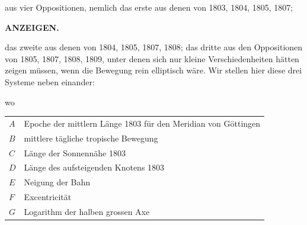 aus vier Oppositionen, nemlich das erste aus denen von 1803, 1804, 1805, 1807;
\par\clearpage
\thispagestyle{empty}
\noindent{}%
%
\parbox[t]{\dimexpr\linewidth-24mm\relax}{\centering\footnotesize\bfseries ANZEIGEN.\par}%
\makebox[12mm][r]{}\par\nobreak\medskip
\noindent das zweite aus denen von 1804, 1805, 1807, 1808; das dritte aus den Oppositionen
von 1805, 1807, 1808, 1809, unter denen sich nur kleine Verschiedenheiten
hätten zeigen müssen, wenn die Bewegung rein elliptisch wäre. Wir stellen
hier diese drei Systeme neben einander:
\par\nobreak\smallskip
\noindent{}\par\nobreak\smallskip
\indent wo\par\nobreak\smallskip
\noindent\hspace*{.06\linewidth}%
\begin{tabular}{@{}l@{\enspace}l@{}}
  $A$ & Epoche der mittlern Länge 1803 für den Meridian von Göttingen\\
  $B$ & mittlere tägliche tropische Bewegung\\
  $C$ & Länge der Sonnennähe 1803\\
  $D$ & Länge des aufsteigenden Knotens 1803\\
  $E$ & Neigung der Bahn\\
  $F$ & Excentricität\\
  $G$ & Logarithm der halben grossen Axe
\end{tabular}\par\nobreak\smallskip
